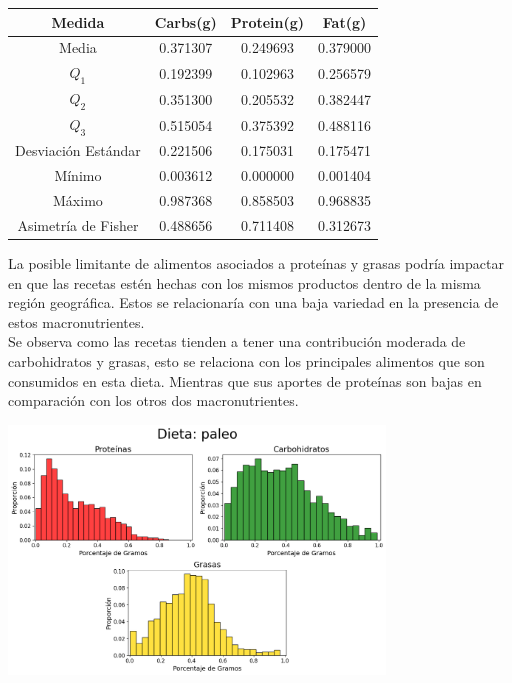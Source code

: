 \documentclass[12pt,a4paper]{article}
\begin{document}
            \begin{center}
                \begin{tabular}{| c | c c c |}
                    \toprule
                    Medida & Carbs(g) & Protein(g) & Fat(g) \\
                    \midrule
                    Media               & 0.371307 & 0.249693 & 0.379000  \\
                    $Q_1$               & 0.192399 & 0.102963 & 0.256579  \\
                    $Q_2$               & 0.351300 & 0.205532 & 0.382447  \\
                    $Q_3$               & 0.515054 & 0.375392 & 0.488116  \\
                    Desviación Estándar & 0.221506 & 0.175031 & 0.175471  \\
                    Mínimo              & 0.003612 & 0.000000 & 0.001404  \\
                    Máximo              & 0.987368 & 0.858503 & 0.968835  \\
                    Asimetría de Fisher & 0.488656 & 0.711408 & 0.312673  \\
                    \bottomrule
                \end{tabular}
            \end{center}

            La posible limitante de alimentos asociados a proteínas	y grasas 
            podría impactar en que las recetas estén hechas con los mismos productos 
            dentro de la misma región geográfica. Estos se relacionaría con una 
            baja variedad en la presencia de estos macronutrientes.\\

            Se observa como las recetas tienden a tener una contribución moderada de 
            carbohidratos y grasas, esto se relaciona con los principales alimentos 
            que son consumidos en esta dieta. Mientras que sus aportes de proteínas 
            son bajas en comparación con los otros dos macronutrientes.
            
            \begin{center}
                \includegraphics[width=0.75\textwidth]{Resources/2_03_plot_04.png}
            \end{center}
\end{document}
